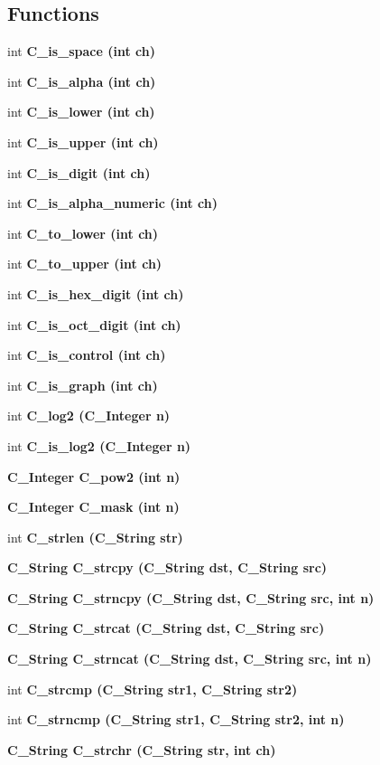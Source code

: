 \subsection*{Functions}
\begin{CompactItemize}
\item 
int \bf{C\_\-is\_\-space} (int ch)
\item 
int \bf{C\_\-is\_\-alpha} (int ch)
\item 
int \bf{C\_\-is\_\-lower} (int ch)
\item 
int \bf{C\_\-is\_\-upper} (int ch)
\item 
int \bf{C\_\-is\_\-digit} (int ch)
\item 
int \bf{C\_\-is\_\-alpha\_\-numeric} (int ch)
\item 
int \bf{C\_\-to\_\-lower} (int ch)
\item 
int \bf{C\_\-to\_\-upper} (int ch)
\item 
int \bf{C\_\-is\_\-hex\_\-digit} (int ch)
\item 
int \bf{C\_\-is\_\-oct\_\-digit} (int ch)
\item 
int \bf{C\_\-is\_\-control} (int ch)
\item 
int \bf{C\_\-is\_\-graph} (int ch)
\item 
int \bf{C\_\-log2} (\bf{C\_\-Integer} n)
\item 
int \bf{C\_\-is\_\-log2} (\bf{C\_\-Integer} n)
\item 
\bf{C\_\-Integer} \bf{C\_\-pow2} (int n)
\item 
\bf{C\_\-Integer} \bf{C\_\-mask} (int n)
\item 
int \bf{C\_\-strlen} (\bf{C\_\-String} str)
\item 
\bf{C\_\-String} \bf{C\_\-strcpy} (\bf{C\_\-String} dst, \bf{C\_\-String} src)
\item 
\bf{C\_\-String} \bf{C\_\-strncpy} (\bf{C\_\-String} dst, \bf{C\_\-String} src, int n)
\item 
\bf{C\_\-String} \bf{C\_\-strcat} (\bf{C\_\-String} dst, \bf{C\_\-String} src)
\item 
\bf{C\_\-String} \bf{C\_\-strncat} (\bf{C\_\-String} dst, \bf{C\_\-String} src, int n)
\item 
int \bf{C\_\-strcmp} (\bf{C\_\-String} str1, \bf{C\_\-String} str2)
\item 
int \bf{C\_\-strncmp} (\bf{C\_\-String} str1, \bf{C\_\-String} str2, int n)
\item 
\bf{C\_\-String} \bf{C\_\-strchr} (\bf{C\_\-String} str, int ch)
\item 

\end{CompactItemize}
